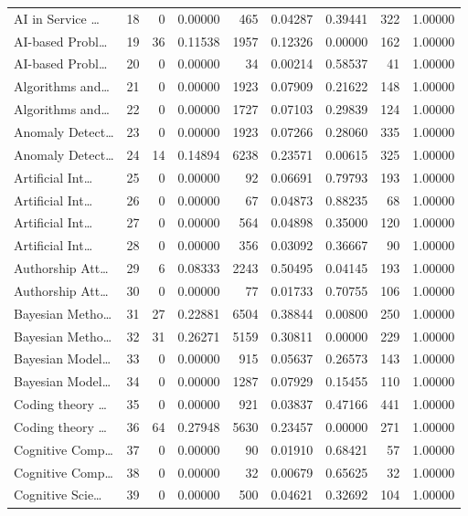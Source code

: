 \begin{table}
\begin{tabular}{lrrrrrrrr}
AI in Service … & 18 & 0 & 0.00000 & 465 & 0.04287 & 0.39441 & 322 & 1.00000 \\
AI-based Probl… & 19 & 36 & 0.11538 & 1957 & 0.12326 & 0.00000 & 162 & 1.00000 \\
AI-based Probl… & 20 & 0 & 0.00000 & 34 & 0.00214 & 0.58537 & 41 & 1.00000 \\
Algorithms and… & 21 & 0 & 0.00000 & 1923 & 0.07909 & 0.21622 & 148 & 1.00000 \\
Algorithms and… & 22 & 0 & 0.00000 & 1727 & 0.07103 & 0.29839 & 124 & 1.00000 \\
Anomaly Detect… & 23 & 0 & 0.00000 & 1923 & 0.07266 & 0.28060 & 335 & 1.00000 \\
Anomaly Detect… & 24 & 14 & 0.14894 & 6238 & 0.23571 & 0.00615 & 325 & 1.00000 \\
Artificial Int… & 25 & 0 & 0.00000 & 92 & 0.06691 & 0.79793 & 193 & 1.00000 \\
Artificial Int… & 26 & 0 & 0.00000 & 67 & 0.04873 & 0.88235 & 68 & 1.00000 \\
Artificial Int… & 27 & 0 & 0.00000 & 564 & 0.04898 & 0.35000 & 120 & 1.00000 \\
Artificial Int… & 28 & 0 & 0.00000 & 356 & 0.03092 & 0.36667 & 90 & 1.00000 \\
Authorship Att… & 29 & 6 & 0.08333 & 2243 & 0.50495 & 0.04145 & 193 & 1.00000 \\
Authorship Att… & 30 & 0 & 0.00000 & 77 & 0.01733 & 0.70755 & 106 & 1.00000 \\
Bayesian Metho… & 31 & 27 & 0.22881 & 6504 & 0.38844 & 0.00800 & 250 & 1.00000 \\
Bayesian Metho… & 32 & 31 & 0.26271 & 5159 & 0.30811 & 0.00000 & 229 & 1.00000 \\
Bayesian Model… & 33 & 0 & 0.00000 & 915 & 0.05637 & 0.26573 & 143 & 1.00000 \\
Bayesian Model… & 34 & 0 & 0.00000 & 1287 & 0.07929 & 0.15455 & 110 & 1.00000 \\
Coding theory … & 35 & 0 & 0.00000 & 921 & 0.03837 & 0.47166 & 441 & 1.00000 \\
Coding theory … & 36 & 64 & 0.27948 & 5630 & 0.23457 & 0.00000 & 271 & 1.00000 \\
Cognitive Comp… & 37 & 0 & 0.00000 & 90 & 0.01910 & 0.68421 & 57 & 1.00000 \\
Cognitive Comp… & 38 & 0 & 0.00000 & 32 & 0.00679 & 0.65625 & 32 & 1.00000 \\
Cognitive Scie… & 39 & 0 & 0.00000 & 500 & 0.04621 & 0.32692 & 104 & 1.00000 \\

\end{tabular}
\end{table}
